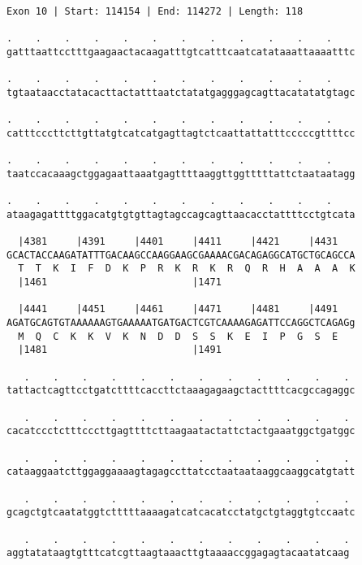 \documentclass{article}
\begin{document}
\begin{Verbatim}[fontfamily=courier]
Exon 10 | Start: 114154 | End: 114272 | Length: 118

.    .    .    .    .    .    .    .    .    .    .    .    
gatttaattcctttgaagaactacaagatttgtcatttcaatcatataaattaaaatttc

.    .    .    .    .    .    .    .    .    .    .    .    
tgtaataacctatacacttactatttaatctatatgagggagcagttacatatatgtagc

.    .    .    .    .    .    .    .    .    .    .    .    
catttcccttcttgttatgtcatcatgagttagtctcaattattatttcccccgttttcc

.    .    .    .    .    .    .    .    .    .    .    .    
taatccacaaagctggagaattaaatgagttttaaggttggtttttattctaataatagg

.    .    .    .    .    .    .    .    .    .    .    .    
ataagagattttggacatgtgtgttagtagccagcagttaacacctattttcctgtcata

  |4381     |4391     |4401     |4411     |4421     |4431   
GCACTACCAAGATATTTGACAAGCCAAGGAAGCGAAAACGACAGAGGCATGCTGCAGCCA
  T  T  K  I  F  D  K  P  R  K  R  K  R  Q  R  H  A  A  A  K
  |1461                         |1471                       

  |4441     |4451     |4461     |4471     |4481     |4491   
AGATGCAGTGTAAAAAAGTGAAAAATGATGACTCGTCAAAAGAGATTCCAGGCTCAGAGg
  M  Q  C  K  K  V  K  N  D  D  S  S  K  E  I  P  G  S  E   
  |1481                         |1491                       

   .    .    .    .    .    .    .    .    .    .    .    . 
tattactcagttcctgatcttttcaccttctaaagagaagctacttttcacgccagaggc

   .    .    .    .    .    .    .    .    .    .    .    . 
cacatccctctttcccttgagttttcttaagaatactattctactgaaatggctgatggc

   .    .    .    .    .    .    .    .    .    .    .    . 
cataaggaatcttggaggaaaagtagagccttatcctaataataaggcaaggcatgtatt

   .    .    .    .    .    .    .    .    .    .    .    . 
gcagctgtcaatatggtctttttaaaagatcatcacatcctatgctgtaggtgtccaatc

   .    .    .    .    .    .    .    .    .    .    .    .
aggtatataagtgtttcatcgttaagtaaacttgtaaaaccggagagtacaatatcaag
\end{Verbatim}
\newpage
\end{document}
